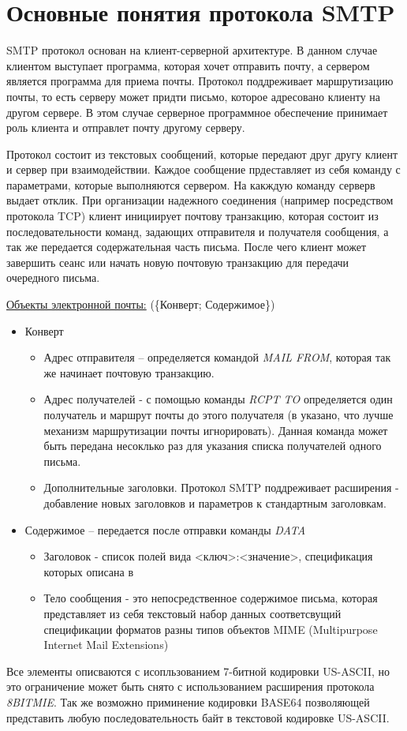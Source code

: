 \documentclass[a4paper,12pt]{report}
\begin{document}
	\section{Основные понятия протокола SMTP}

	 SMTP протокол основан на клиент-серверной архитектуре. В данном случае клиентом выступает программа, которая хочет отправить почту, а сервером является программа для приема почты. Протокол поддреживает маршрутизацию почты, то есть серверу может придти письмо, которое адресовано клиенту на другом сервере. В этом случае серверное программное обеспечение принимает роль клиента и отправлет почту другому серверу. 

	 Протокол состоит из текстовых сообщений, которые передают друг другу клиент и сервер при взаимодействии. Каждое сообщение прдеставляет из себя команду с параметрами, которые выполняются сервером. На какждую команду серверв выдает отклик. При организации надежного соединения (например посредством протокола TCP) клиент инициирует почтову транзакцию, которая состоит из последовательности команд, задающих отправителя и получателя сообщения, а так же передается содержательная часть письма. После чего клиент может завершить сеанс или начать новую почтовую транзакцию для передачи очередного письма.

	 \underline{Объекты электронной почты:} (\{Конверт; Содержимое\})
	 \begin{itemize}
	 	\item Конверт
	 	   \begin{itemize}
	 	       \item Адрес отправителя -- определяется командой \textit{MAIL FROM}, которая так же начинает почтовую транзакцию. 
	 	       \item Адрес получателей - с помощью команды \textit{RCPT TO} определяется один получатель и маршрут почты до этого получателя (в \cite{rfc2821} указано, что лучше механизм маршрутизации почты игнорировать). Данная команда может быть передана несоклько раз для указания списка получателей одного письма.
	 	       \item Дополнительные заголовки. Протокол SMTP поддреживает расширения - добавление новых заголовков и параметров к стандартным заголовкам.
	 	   \end{itemize}
	 	  \item Содержимое -- передается после отправки команды \textit{DATA}
	 	  \begin{itemize}
	 	      \item Заголовок - список полей вида <ключ>:<значение>, спецификация которых описана в \cite{rfc5322}
	 	      \item Тело сообщения - это непосредственное содержимое письма, которая представляет из себя текстовый набор данных соответсвущий спецификации форматов разны типов объектов MIME (Multipurpose Internet Mail Extensions)
	 	  \end{itemize}
	 \end{itemize}
	 Все элементы описваются с исопльзованием 7-битной кодировки US-ASCII, но это ограничение может быть снято с использованием расширения протокола \textit{8BITMIE}. Так же возможно приминение кодировки BASE64 позволяющей представить любую последовательность байт в текстовой кодировке US-ASCII.
	
\end{document}
